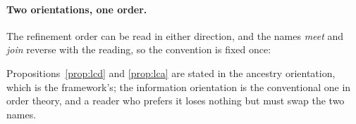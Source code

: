 \paragraph{Two orientations, one order.} The refinement order can be read in either direction, and the names \emph{meet} and \emph{join} reverse with the reading, so the convention is fixed once:
\begin{center}\end{center}
\noindent Propositions~\ref{prop:lcd} and \ref{prop:lca} are stated in the ancestry orientation, which is the framework's; the information orientation is the conventional one in order theory, and a reader who prefers it loses nothing but must swap the two names.

